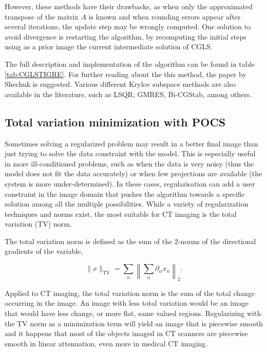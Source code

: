 However, these methods have their drawbacks, as when only the approximated transpose of the matrix $A$ is known and when rounding errors appear after several iterations, the update step may be wrongly computed. One solution to avoid divergence is restarting the algorithm, by recomputing the initial steps using as a prior image the current intermediate solution of CGLS.

The full description and implementation of the algorithm can be found in table \ref{tab:CGLSTIGRE}. For further reading about the this method, the paper by Shechuk is suggested\cite{shewchuk1994introduction}. Various different Krylov subspace methods are also available in the literature, such as LSQR\cite{qiu2012blockwise}, GMRES\cite{GMRES}, Bi-CGStab\cite{van1992bi}, among others.
\subsection{Total variation minimization with POCS}

Sometimes solving a regularized problem may result in a better final image than just trying to solve the data constraint with the model. This is especially useful in more ill-conditioned problems, such as when the data is very noisy (thus the model does not fit the data accurately) or when few projections are available (the system is more under-determined). In these cases, regularisation can add a user constraint in the image domain that pushes the algorithm towards a specific solution among all the multiple possibilities. While a variety of regularization techniques and norms exist, the most suitable for CT imaging is the total variation (TV) norm.

The total variation norm is defined as the sum of the 2-norms of the directional gradients of the variable,

\begin{equation}
\lVert x \rVert_\text{TV}=\sum_n\left\lVert \sum_\alpha\partial_\alpha x_n \right\rVert_2.
\end{equation}

Applied to CT imaging, the total variation norm is the sum of the total change occurring in the image. An image with less total variation would be an image that would have less change, or more flat, same valued regions. Regularizing with the TV norm as a minimization term will yield an image that is piecewise smooth and it happens that most of the objects imaged in CT scanners are piecewise smooth in linear attenuation, even more in medical CT imaging. 

